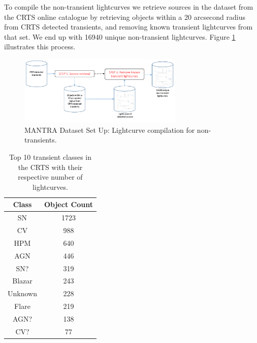 \documentclass{aastex62}
\begin{document}
To compile the non-transient lightcurves we retrieve sources in the
dataset from the CRTS online catalogue by retrieving objects within a
20 arcsecond radius from CRTS detected transients, 
and removing known transient lightcurves from that set. 
We end up with 16940 unique non-transient lightcurves. Figure \ref{fig:non-transients} illustrates this process.

\begin{figure}
	\includegraphics[width=0.7\textwidth]{NonTransients.pdf}
  \caption{MANTRA Dataset Set Up: Lightcurve compilation for non-transients.}
  \label{fig:non-transients}
\end{figure} 

\begin{table}
\centering
\begin{tabular}{c|c}
    \hline
    Class &  Object Count \\
    \hline
SN & 1723 \\
CV & 988 \\
HPM & 640 \\
AGN & 446 \\
SN? & 319 \\
Blazar & 243 \\
Unknown & 228 \\
Flare & 219 \\
AGN? & 138 \\
CV? & 77 \\
    \hline
\end{tabular}
\caption{Top 10 transient classes in the CRTS with their respective number of lightcurves.} 
\label{table:top_classes}
\end{table}
\end{document}
